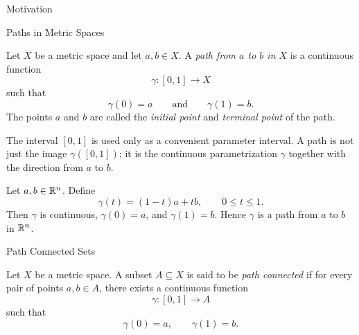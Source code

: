 \documentclass[12pt, a4paper]{article}
\begin{document}
\FrontPage
\Large

\begin{heading}
    Motivation
\end{heading}

\clearpage

\begin{heading}
    Paths in Metric Spaces
\end{heading}

\vspace{10pt}

\begin{definition}[Path]
Let $X$ be a metric space and let $a,b\in X$. A \textit{path from $a$ to $b$ in $X$} is a continuous function
\[
    \gamma:[0,1]\to X
\]
such that
\[
    \gamma(0)=a
    \qquad\text{and}\qquad
    \gamma(1)=b.
\]
The points $a$ and $b$ are called the \textit{initial point} and \textit{terminal point} of the path.
\end{definition}

\vfill

\begin{problem}[Remark]
The interval $[0,1]$ is used only as a convenient parameter interval. A path is not just the image $\gamma([0,1])$; it is the continuous parametrization $\gamma$ together with the direction from $a$ to $b$.
\end{problem}

\clearpage

\begin{problem}
Let $a,b\in\mathbb{R}^n$. Define
\[
    \gamma(t)=(1-t)a+tb,
    \qquad 0\leq t\leq 1.
\]
Then $\gamma$ is continuous, $\gamma(0)=a$, and $\gamma(1)=b$. Hence $\gamma$ is a path from $a$ to $b$ in $\mathbb{R}^n$.
\end{problem}

\clearpage

\begin{heading}
    Path Connected Sets
\end{heading}

\vspace{10pt}

\begin{definition}
Let $X$ be a metric space. A subset $A\subseteq X$ is said to be \textit{path connected} if for every pair of points $a,b\in A$, there exists a continuous function
\[
    \gamma:[0,1]\to A
\]
such that
\[
    \gamma(0)=a,
    \qquad
    \gamma(1)=b.
\]
\end{definition}
\end{document}
